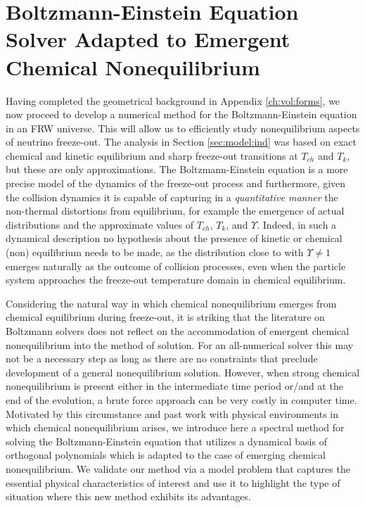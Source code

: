 \section{Boltzmann-Einstein Equation Solver Adapted to Emergent Chemical Nonequilibrium}\label{ch:boltz:orthopoly}

Having completed the geometrical background in Appendix \ref{ch:vol:forms}, we now proceed to develop a numerical method for the Boltzmann-Einstein equation in an FRW universe.  This will allow us to efficiently study  nonequilibrium aspects of neutrino freeze-out. The analysis in Section \ref{sec:model:ind} was based on exact chemical and kinetic equilibrium and sharp freeze-out transitions at $T_{ch}$ and $T_k$, but these are  only approximations.  The  Boltzmann-Einstein equation is a more precise model of the dynamics of the freeze-out process and furthermore, given the collision dynamics it is capable of capturing in a {\em quantitative manner} the non-thermal distortions from equilibrium, for example the emergence of actual distributions and the approximate values  of $T_{ch}$, $T_k$, and $\Upsilon$.  Indeed,  in  such a dynamical description no hypothesis about the presence of kinetic or chemical (non) equilibrium needs to be made, as the distribution close to  with   $\Upsilon\ne  1$ emerges naturally as the outcome of collision processes, even when the particle system approaches the freeze-out temperature domain  in chemical equilibrium.

Considering the natural way in which chemical nonequilibrium emerges from chemical equilibrium during freeze-out, it is striking that the literature on Boltzmann solvers does not reflect on the accommodation of emergent chemical nonequilibrium into the method of solution. For an all-numerical solver this may not be a necessary step as long as there are no constraints that preclude development of a general nonequilibrium solution. However, when strong chemical nonequilibrium is present either in the intermediate time period or/and at the end of the evolution, a brute force approach can be very costly in computer time. Motivated by this circumstance and past work with physical environments in which chemical nonequilibrium arises,  we introduce here a  spectral method for solving the Boltzmann-Einstein equation that utilizes a dynamical basis of orthogonal polynomials which is adapted to the case of emerging chemical nonequilibrium. We validate our method via a  model problem  that captures the essential physical characteristics of interest and use it to highlight the type of situation where this new method exhibits its advantages.

